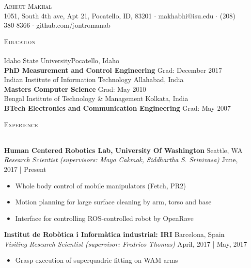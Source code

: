 \documentclass[a4paper]{article}
\newcommand{\lineunder} {
    \vspace*{-8pt} \\
    \hspace*{-18pt} \hrulefill \\
}
\newcommand{\header} [1] {
    {\hspace*{-18pt}\vspace*{6pt} \textsc{#1}}
    \vspace*{-6pt} \lineunder
}
\begin{document}
\vspace*{-40pt}

\vspace*{-10pt}
\begin{center}
	{\Huge \scshape {Abhijit Makhal}}\\
	1051, South 4th ave, Apt 21, Pocatello, ID, 83201 $\cdot$ makhabhi@isu.edu $\cdot$ (208) 380-8366 $\cdot$ github.com/jontromanab\\
\end{center}

\vspace*{2mm}

\header{Education}
Idaho State University\hfill Pocatello, Idaho\\
\textbf{PhD Measurement and Control Engineering} \hfill Grad: December 2017\\
\vspace{2mm}
Indian Institute of Information Technology \hfill Allahabad, India\\
\textbf{Masters Computer Science} \hfill Grad: May 2010\\
\vspace{2mm}
Bengal Institute of Technology \& Management \hfill Kolkata, India\\
\textbf{BTech Electronics and Communication Engineering} \hfill Grad: May 2007\\
\vspace{2mm}

\vspace*{2mm}

\header{Experience}
\vspace{1mm}

\textbf{Human Centered Robotics Lab, University Of Washington} \hfill Seattle, WA\\
\textit{Research Scientist (supervisors: Maya Cakmak, Siddhartha S. Srinivasa)}
\hfill  June, 2017 | Present\\
\vspace{-1mm}
\begin{itemize} \itemsep 1pt
	\item Whole body control of mobile manipulators (Fetch, PR2)
	\item Motion planning for large surface cleaning by arm, torso and base
	\item Interface for controlling ROS-controlled robot by OpenRave
\end{itemize}

\textbf{Institut de Rob\`{o}tica i Inform\`{a}tica industrial: IRI} \hfill Barcelona, Spain\\
\textit{Visiting Research Scientist (supervisor: Fredrico Thomas)} \hfill April, 2017 | May, 2017\\
\vspace{-1mm}
\begin{itemize} \itemsep 1pt
	\item Grasp execution of superquadric fitting on WAM arms
\end{itemize}
\end{document}
